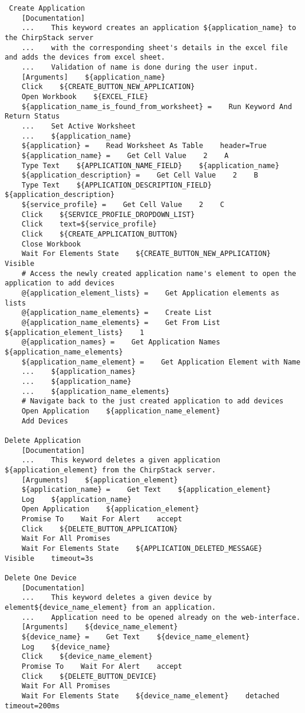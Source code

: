 \begin{verbatim}
 Create Application
    [Documentation]
    ...    This keyword creates an application ${application_name} to the ChirpStack server
    ...    with the corresponding sheet's details in the excel file and adds the devices from excel sheet.
    ...    Validation of name is done during the user input.
    [Arguments]    ${application_name}
    Click    ${CREATE_BUTTON_NEW_APPLICATION}
    Open Workbook    ${EXCEL_FILE}
    ${application_name_is_found_from_worksheet} =    Run Keyword And Return Status
    ...    Set Active Worksheet
    ...    ${application_name}
    ${application} =    Read Worksheet As Table    header=True
    ${application_name} =    Get Cell Value    2    A
    Type Text    ${APPLICATION_NAME_FIELD}    ${application_name}
    ${application_description} =    Get Cell Value    2    B
    Type Text    ${APPLICATION_DESCRIPTION_FIELD}    ${application_description}
    ${service_profile} =    Get Cell Value    2    C
    Click    ${SERVICE_PROFILE_DROPDOWN_LIST}
    Click    text=${service_profile}
    Click    ${CREATE_APPLICATION_BUTTON}
    Close Workbook
    Wait For Elements State    ${CREATE_BUTTON_NEW_APPLICATION}    Visible
    # Access the newly created application name's element to open the application to add devices
    @{application_element_lists} =    Get Application elements as lists
    @{application_name_elements} =    Create List
    @{application_name_elements} =    Get From List    ${application_element_lists}    1
    @{application_names} =    Get Application Names    ${application_name_elements}
    ${application_name_element} =    Get Application Element with Name
    ...    ${application_names}
    ...    ${application_name}
    ...    ${application_name_elements}
    # Navigate back to the just created application to add devices
    Open Application    ${application_name_element}
    Add Devices

Delete Application
    [Documentation]
    ...    This keyword deletes a given application ${application_element} from the ChirpStack server.
    [Arguments]    ${application_element}
    ${application_name} =    Get Text    ${application_element}
    Log    ${application_name}
    Open Application    ${application_element}
    Promise To    Wait For Alert    accept
    Click    ${DELETE_BUTTON_APPLICATION}
    Wait For All Promises
    Wait For Elements State    ${APPLICATION_DELETED_MESSAGE}    Visible    timeout=3s

Delete One Device
    [Documentation]
    ...    This keyword deletes a given device by element${device_name_element} from an application.
    ...    Application need to be opened already on the web-interface.
    [Arguments]    ${device_name_element}
    ${device_name} =    Get Text    ${device_name_element}
    Log    ${device_name}
    Click    ${device_name_element}
    Promise To    Wait For Alert    accept
    Click    ${DELETE_BUTTON_DEVICE}
    Wait For All Promises
    Wait For Elements State    ${device_name_element}    detached    timeout=200ms


\end{verbatim}
